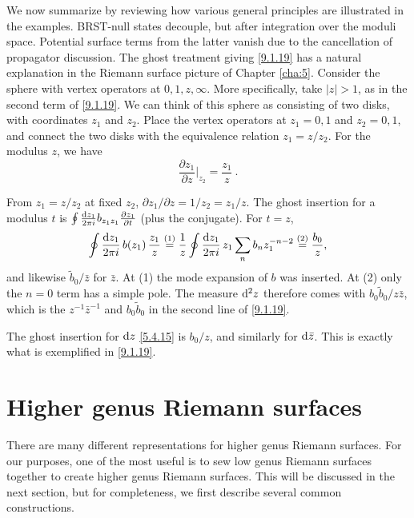 We now summarize by reviewing how various general principles are illustrated in the examples. BRST-null states decouple, but after integration over the moduli space. 
Potential surface terms from the latter vanish due to the cancellation of propagator discussion. The ghost treatment giving \eqref{9.1.19} has a natural explanation in the Riemann surface picture of Chapter \ref{cha:5}. 
Consider the sphere with vertex operators at $0,1, z, \infty$.
More specifically, take $|z|>1$, as in the second term of \eqref{9.1.19}. We can think of this sphere as consisting of two disks, 
with coordinates $z_{1}$ and $z_{2}$. Place the vertex operators at $z_{1}=0,1$ and $z_{2}=0,1$, and connect the two disks with the equivalence relation $z_{1}=z / z_{2}$.
For the modulus $z$, we have
\begin{equation}
	\frac{\partial z_{1}}{\partial z}\biggr|_{z_{2}}=\frac{z_{1}}{z} \:. \label{9.1.34}
\end{equation}
\begin{tcolorbox}[breakable]
	\begin{remark}
		From $z_1=z/z_2$ at fixed $z_2$, $\partial z_1/\partial z=1/z_2=z_1/z$. The ghost insertion for a modulus $t$ is $\oint\frac{\mathrm{d} z_1}{2\pi i}b_{z_1z_1}\frac{\partial z_1}{\partial t}$ (plus the conjugate). For $t=z$,
		\begin{equation*}
			\oint\frac{\mathrm{d} z_1}{2\pi i}\,b(z_1)\,\frac{z_1}{z}\overset{(1)}{=}\frac{1}{z}\oint\frac{\mathrm{d} z_1}{2\pi i}\,z_1\sum_nb_nz_1^{-n-2}\overset{(2)}{=}\frac{b_0}{z},
		\end{equation*}
		and likewise $\tilde b_0/\bar z$ for $\bar z$. At (1) the mode expansion of $b$ was inserted. At (2) only the $n=0$ term has a simple pole. The measure $\mathrm{d}^2z$ therefore comes with $b_0\tilde b_0/z\bar z$, which is the $z^{-1}\bar z^{-1}$ and $b_0\tilde b_0$ in the second line of \eqref{9.1.19}.
	\end{remark}
\end{tcolorbox}
The ghost insertion for $\mathrm{d} z$ \eqref{5.4.15} is $b_{0} / z$, and similarly for $\mathrm{d} \bar{z}$. This is exactly what is exemplified in \eqref{9.1.19}.
\section{Higher genus Riemann surfaces} \label{sec:9.2}

There are many different representations for higher genus Riemann surfaces. For our purposes, one of the most useful is to sew low genus Riemann surfaces together to create higher genus Riemann surfaces. 
This will be discussed in the next section, but for completeness, we first describe several common constructions.


